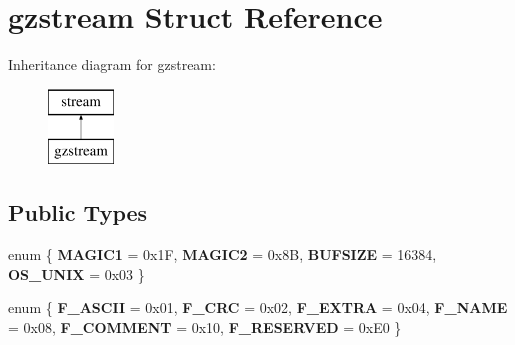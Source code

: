 \hypertarget{structgzstream}{}\section{gzstream Struct Reference}
\label{structgzstream}
Inheritance diagram for gzstream\+:\begin{figure}[H]
\begin{center}
\leavevmode
\includegraphics[height=2.000000cm]{structgzstream}
\end{center}
\end{figure}
\subsection*{Public Types}
\begin{DoxyCompactItemize}
\item 
\mbox{\label{structgzstream_a140871c2fa96253cb29b76bb58b9c76a}} 
enum \{ {\bfseries M\+A\+G\+I\+C1} = 0x1F, 
{\bfseries M\+A\+G\+I\+C2} = 0x8B, 
{\bfseries B\+U\+F\+S\+I\+ZE} = 16384, 
{\bfseries O\+S\+\_\+\+U\+N\+IX} = 0x03
 \}
\item 
\mbox{\label{structgzstream_ac34b61c709a5fb76430cb31b00266a55}} 
enum \{ \newline
{\bfseries F\+\_\+\+A\+S\+C\+II} = 0x01, 
{\bfseries F\+\_\+\+C\+RC} = 0x02, 
{\bfseries F\+\_\+\+E\+X\+T\+RA} = 0x04, 
{\bfseries F\+\_\+\+N\+A\+ME} = 0x08, 
\newline
{\bfseries F\+\_\+\+C\+O\+M\+M\+E\+NT} = 0x10, 
{\bfseries F\+\_\+\+R\+E\+S\+E\+R\+V\+ED} = 0x\+E0
 \}
\end{DoxyCompactItemize}
